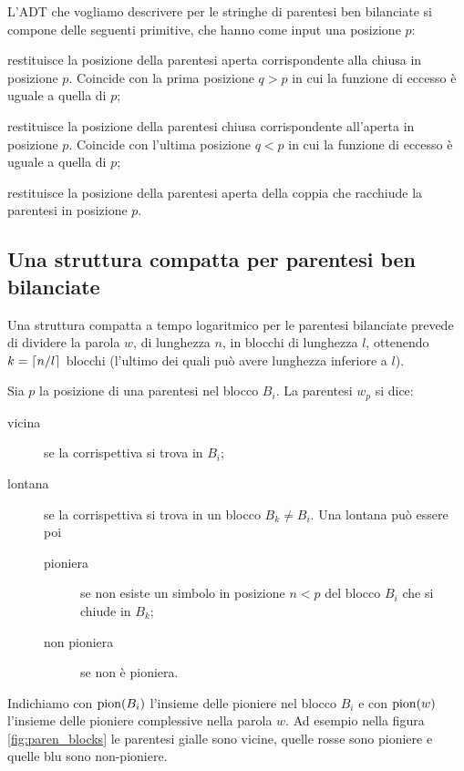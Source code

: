 L'ADT che vogliamo descrivere per le stringhe di parentesi ben bilanciate si compone delle seguenti primitive, che hanno come input una posizione $p$:
\begin{description}
	\renewcommand{\dyfindopen}{\mathbf{find\_open}}
	\renewcommand{\dyfindclosed}{\mathbf{find\_closed}}
	\renewcommand{\dyenclose}{\mathbf{enclose}}
	\item[$\dyfindopen$] restituisce la posizione della parentesi aperta corrispondente alla chiusa in posizione $p$. Coincide con la prima posizione $q>p$ in cui la funzione di eccesso è uguale a quella di $p$;
	\item[$\dyfindclosed$] restituisce la posizione della parentesi chiusa corrispondente all'aperta in posizione $p$. Coincide con l'ultima posizione $q<p$ in cui la funzione di eccesso è uguale a quella di $p$;
	\item[$\dyenclose$] restituisce la posizione della parentesi aperta della coppia che racchiude la parentesi in posizione $p$.
\end{description}


\subsection{Una struttura compatta per parentesi ben bilanciate}
Una struttura compatta a tempo logaritmico per le parentesi bilanciate prevede di dividere la parola $w$, di lunghezza $n$, in blocchi di lunghezza $l$, ottenendo $k=\left\lceil n/l \right\rceil$ blocchi (l'ultimo dei quali può avere lunghezza inferiore a $l$).

Sia $p$ la posizione di una parentesi nel blocco $B_i$. La parentesi $w_p$ si dice:
\begin{description}
	\item[vicina] se la corrispettiva si trova in $B_i$;
	\item[lontana] se la corrispettiva si trova in un blocco $B_k\neq B_i$. Una lontana può essere poi
		\begin{description}
			\item[pioniera] se non esiste un simbolo in posizione $n<p$ del blocco $B_i$ che si chiude in $B_k$;
			\item[non pioniera] se non è pioniera.
		\end{description}
\end{description}
Indichiamo con $\mathrm{pion}(B_i)$ l'insieme delle pioniere nel blocco $B_i$ e con $\mathrm{pion}(w)$ l'insieme delle pioniere complessive nella parola $w$.
Ad esempio nella figura \ref{fig:paren_blocks} le parentesi gialle sono vicine, quelle rosse sono pioniere e quelle blu sono non-pioniere.

